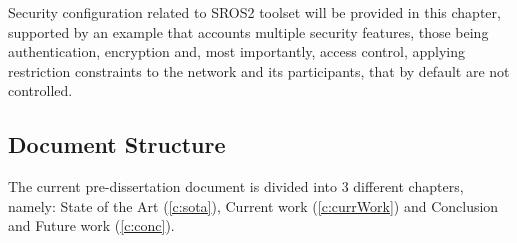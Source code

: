 Security configuration related to SROS2 toolset will be provided in this chapter, supported by an example that accounts multiple security features, those being authentication, encryption and, most importantly, access control, applying restriction constraints to the network and its participants, that by default are not controlled.


\subsection{Document Structure}
The current pre-dissertation document is divided into 3 different chapters, namely: State of the Art (\ref{c:sota}), Current work (\ref{c:currWork}) and Conclusion and Future work (\ref{c:conc}).